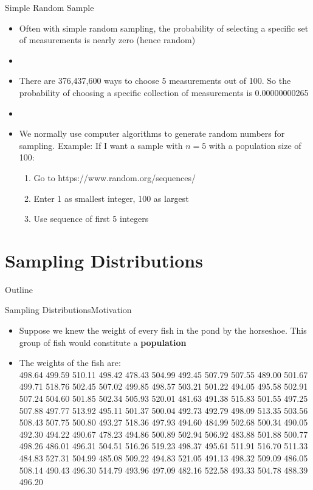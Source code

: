 \documentclass[xcolor=dvipsnames]{beamer}
\begin{document}
\begin{frame}{Simple Random Sample}
	\begin{itemize}
		\item Often with simple random sampling, the probability of selecting a specific set of measurements is nearly zero (hence random) 
		\item[]
		\item There are 376,437,600 ways to choose 5 measurements out of 100. So the probability of choosing a specific collection of measurements is 0.00000000265
		\item[]
		\item We normally use computer algorithms to generate random numbers for sampling. Example: If I want a sample with $n=5$ with a population size of 100:
		\begin{enumerate}
			\item Go to https://www.random.org/sequences/
			\item Enter 1 as smallest integer, 100 as largest
			\item Use sequence of first 5 integers
		\end{enumerate}
	\end{itemize}
\end{frame}

\section{Sampling Distributions}
\begin{frame}{Outline}
	\tableofcontents[currentsection,subsectionstyle=show/shaded/hide]
\end{frame}

\begin{frame}{Sampling Distributions}{Motivation}
	\begin{itemize}
		\item Suppose we knew the weight of every fish in the pond by the horseshoe. This group of fish would constitute a \textbf{population}
		\item The weights of the fish are: \\
		498.64 499.59 510.11 498.42 478.43 504.99 492.45 507.79 507.55 489.00 501.67 499.71 518.76 502.45 507.02 499.85
		498.57 503.21 501.22 494.05 495.58 502.91 507.24 504.60 501.85 502.34 505.93 520.01 481.63 491.38 515.83 501.55
		497.25 507.88 497.77 513.92 495.11 501.37 500.04 492.73 492.79 498.09 513.35 503.56 508.43 507.75 500.80 493.27
		518.36 497.93 494.60 484.99 502.68 500.34 490.05 492.30 494.22 490.67 478.23 494.86 500.89 502.94 506.92 483.88
		501.88 500.77 498.26 486.01 496.31 504.51 516.26 519.23 498.37 495.61 511.91 516.70 511.33 484.83 527.31 504.99
		485.08 509.22 494.83 521.05 491.13 498.32 509.09 486.05 508.14 490.43 496.30 514.79 493.96 497.09 482.16 522.58
		493.33 504.78 488.39 496.20
	\end{itemize}
\end{frame}
\end{document}

